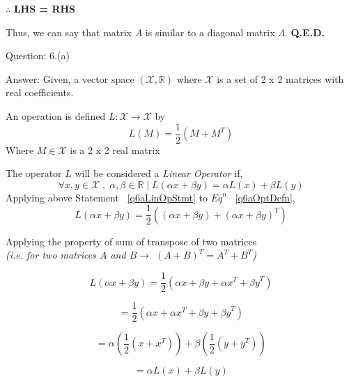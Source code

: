 \documentclass[a4paper]{article}
\begin{document}
\begin{qalist}
			$\therefore$ \textbf{LHS = RHS}
			
			Thus, we can say that matrix $A$ is similar to a diagonal matrix $\Lambda$.
			\textbf{Q.E.D.}
%			
		\item[Question: 6.(a)] \setcounter{equation}{0} 
		\item[Answer:] Given, a vector space $(\mathcal{X}, \mathbb{R})$ where $\mathcal{X}$ is a set of 2 x 2 matrices with real coefficients.
		
		An operation is defined $L : \mathcal{X} \rightarrow \mathcal{X}$ by 
		\begin{equation}\label{q6aOptDefn}
			L(M) = \frac{1}{2} (M + {M}^{T})
		\end{equation}
		Where $M \in \mathcal{X}$ is a 2 x 2 real matrix
		
		The operator $L$ will be considered a \textit{Linear Operator} if, 
		\begin{equation}\label{q6aLinOpStmt}
			\forall x,y \in \mathcal{X} \;,\; \alpha, \beta \in \mathbb{R}\;|\;L(\alpha x + \beta y) = \alpha L(x) + \beta L(y)
		\end{equation}
		Applying above Statement ~\ref{q6aLinOpStmt} to ${Eq}^{n}$ ~\ref{q6aOptDefn},
		\begin{equation}\label{q6aPrfStart}
			L(\alpha x + \beta y) = \frac{1}{2}((\alpha x + \beta y) + {(\alpha x + \beta y)}^{T})
		\end{equation}
		
		Applying the property of sum of transpose of two matrices \\ \textit{(i.e. for two matrices $A$ and $B \rightarrow$ ${(A+B)}^{T} = {A}^{T} + {B}^{T}$)}
		
		\begin{equation}\label{q6aPrfTranspose}
			L(\alpha x + \beta y) = \frac{1}{2}(\alpha x + \beta y + {\alpha x}^{T} + {\beta y}^{T})
		\end{equation}
		
		\begin{equation}\label{q6aPrfRearrange}
			= \frac{1}{2}(\alpha x + {\alpha x}^{T} + \beta y  + {\beta y}^{T})
		\end{equation}
		
		\begin{equation}\label{q6aPrfTakingCommon}
			= \alpha (\frac{1}{2}(x + {x}^{T})) + \beta(\frac{1}{2}(y  + {y}^{T}))
		\end{equation}
		
		\begin{equation}\label{q6aPrfBackSubn}
			= \alpha L(x) + \beta L(y)
		\end{equation}
		

\end{qalist}
\end{document}
